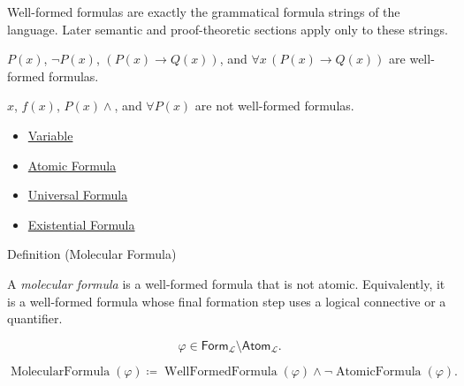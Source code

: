 \begin{remark*}[Interpretation]
Well-formed formulas are exactly the grammatical formula strings of the
language. Later semantic and proof-theoretic sections apply only to these
strings.
\end{remark*}

\begin{remark*}[Examples]
\(P(x)\), \(\neg P(x)\), \((P(x)\to Q(x))\), and
\(\forall x\,(P(x)\to Q(x))\) are well-formed formulas.
\end{remark*}

\begin{remark*}
\(x\), \(f(x)\), \(P(x)\land\), and \(\forall P(x)\) are not well-formed
formulas.
\end{remark*}

\begin{dependencies}
\begin{itemize}
  \item \hyperref[def:variable]{Variable}
  \item \hyperref[def:atomic-formula]{Atomic Formula}
  \item \hyperref[def:universal-q]{Universal Formula}
  \item \hyperref[def:existential-q]{Existential Formula}
\end{itemize}
\end{dependencies}

\begin{definitionbox}{Definition (Molecular Formula)}
\begin{definition}
\label{def:molecular}
A \emph{molecular formula} is a well-formed formula that is not atomic.
Equivalently, it is a well-formed formula whose final formation step uses a
logical connective or a quantifier.
\end{definition}
\end{definitionbox}

\begin{remark*}
\[
\varphi\in\mathsf{Form}_{\mathcal L}\setminus\mathsf{Atom}_{\mathcal L}.
\]
\end{remark*}

\begin{remark*}
\[
\operatorname{MolecularFormula}(\varphi)
\coloneqq
\operatorname{WellFormedFormula}(\varphi)
\land
\neg\operatorname{AtomicFormula}(\varphi).
\]
\end{remark*}

